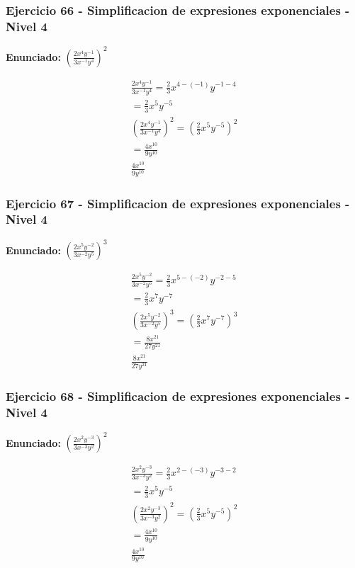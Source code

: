 \documentclass[12pt,a4paper]{article}
\begin{document}
\subsubsection*{Ejercicio 66 - Simplificacion de expresiones exponenciales - Nivel 4}
\textbf{Enunciado:} \(\left(\frac{2x^{4}y^{-1}}{3x^{-1}y^{4}}\right)^{2}\)

\[
\begin{aligned}
\frac{2x^{4}y^{-1}}{3x^{-1}y^{4}}=\frac{2}{3}x^{4-(-1)}y^{-1-4}\\
=\frac{2}{3}x^{5}y^{-5}\\
\left(\frac{2x^{4}y^{-1}}{3x^{-1}y^{4}}\right)^{2}=\left(\frac{2}{3}x^{5}y^{-5}\right)^{2}\\
=\frac{4x^{10}}{9y^{10}}\\
\boxed{\frac{4x^{10}}{9y^{10}}}
\end{aligned}
\]


\subsubsection*{Ejercicio 67 - Simplificacion de expresiones exponenciales - Nivel 4}
\textbf{Enunciado:} \(\left(\frac{2x^{5}y^{-2}}{3x^{-2}y^{5}}\right)^{3}\)

\[
\begin{aligned}
\frac{2x^{5}y^{-2}}{3x^{-2}y^{5}}=\frac{2}{3}x^{5-(-2)}y^{-2-5}\\
=\frac{2}{3}x^{7}y^{-7}\\
\left(\frac{2x^{5}y^{-2}}{3x^{-2}y^{5}}\right)^{3}=\left(\frac{2}{3}x^{7}y^{-7}\right)^{3}\\
=\frac{8x^{21}}{27y^{21}}\\
\boxed{\frac{8x^{21}}{27y^{21}}}
\end{aligned}
\]


\subsubsection*{Ejercicio 68 - Simplificacion de expresiones exponenciales - Nivel 4}
\textbf{Enunciado:} \(\left(\frac{2x^{2}y^{-3}}{3x^{-3}y^{2}}\right)^{2}\)

\[
\begin{aligned}
\frac{2x^{2}y^{-3}}{3x^{-3}y^{2}}=\frac{2}{3}x^{2-(-3)}y^{-3-2}\\
=\frac{2}{3}x^{5}y^{-5}\\
\left(\frac{2x^{2}y^{-3}}{3x^{-3}y^{2}}\right)^{2}=\left(\frac{2}{3}x^{5}y^{-5}\right)^{2}\\
=\frac{4x^{10}}{9y^{10}}\\
\boxed{\frac{4x^{10}}{9y^{10}}}
\end{aligned}
\]
\end{document}
